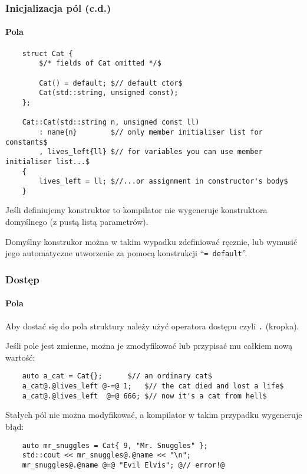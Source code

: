 \documentclass[aspectratio=169,10pt]{beamer}
\begin{document}
\begin{frame}[fragile]
    \frametitle{Inicjalizacja pól (c.d.)}
    \framesubtitle{Pola}
    \label{ctor_field_init_example}

    {\scriptsize
    \begin{lstlisting}
    struct Cat {
        $/* fields of Cat omitted */$

        Cat() = default; $// default ctor$
        Cat(std::string, unsigned const);
    };

    Cat::Cat(std::string n, unsigned const ll)
        : name{n}        $// only member initialiser list for constants$
        , lives_left{ll} $// for variables you can use member initialiser list...$
    {
        lives_left = ll; $//...or assignment in constructor's body$
    }
    \end{lstlisting}}

    Jeśli definiujemy konstruktor to kompilator nie wygeneruje konstruktora
    domyślnego (z pustą listą parametrów).

    Domyślny konstrukor można w takim wypadku zdefiniować ręcznie, lub wymusić
    jego automatyczne utworzenie za pomocą konstrukcji ``\texttt{=~default}''.
\end{frame}

\begin{frame}[fragile]
    \frametitle{Dostęp}
    \framesubtitle{Pola}

    Aby dostać się do pola struktury należy użyć operatora dostępu czyli {\tt .}
    (kropka).

    Jeśli pole jest zmienne, można je zmodyfikować lub przypisać mu całkiem nową
    wartość:

    {\small
    \begin{lstlisting}
    auto a_cat = Cat{};      $// an ordinary cat$
    a_cat@.@lives_left @-=@ 1;   $// the cat died and lost a life$
    a_cat@.@lives_left  @=@ 666; $// now it's a cat from hell$
    \end{lstlisting}}

    Stałych pól nie można modyfikować, a kompilator w takim przypadku wygeneruje
    błąd:

    {\small
    \begin{lstlisting}
    auto mr_snuggles = Cat{ 9, "Mr. Snuggles" };
    std::cout << mr_snuggles@.@name << "\n";
    mr_snuggles@.@name @=@ "Evil Elvis"; @// error!@
    \end{lstlisting}}
\end{frame}
\end{document}
